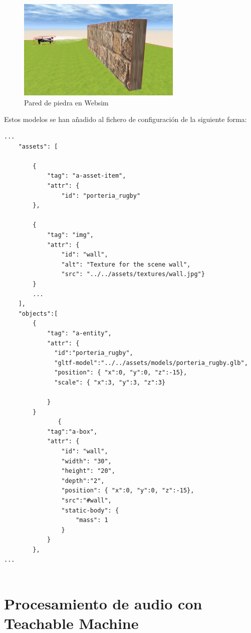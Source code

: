 \begin{figure}[H]
\centering
    \includegraphics[width=0.7\textwidth, height=0.5\textwidth]{chapters/images/pared.png}
    \caption{Pared de piedra en Websim}
    \label{fig:f1}
  \end{figure}

Estos modelos se han añadido al fichero de configuración de la siguiente forma:
\begin{lstlisting}
...
    "assets": [

        {
            "tag": "a-asset-item",
            "attr": {
                "id": "porteria_rugby"
		},
		
		{
            "tag": "img",
            "attr": {
                "id": "wall",
                "alt": "Texture for the scene wall",
                "src": "../../assets/textures/wall.jpg"}
        }
		...
    ],
    "objects":[ 
        {
            "tag": "a-entity",
            "attr": {
              "id":"porteria_rugby",
              "gltf-model":"../../assets/models/porteria_rugby.glb",
              "position": { "x":0, "y":0, "z":-15},
              "scale": { "x":3, "y":3, "z":3}

            }
        }
               {
            "tag":"a-box",
            "attr": {
                "id": "wall",
                "width": "30",
                "height": "20",
                "depth":"2",
                "position": { "x":0, "y":0, "z":-15},
                "src":"#wall",
                "static-body": {
                    "mass": 1
                }
            }
        },
...
  
\end{lstlisting}


\section{Procesamiento de audio con Teachable Machine}

